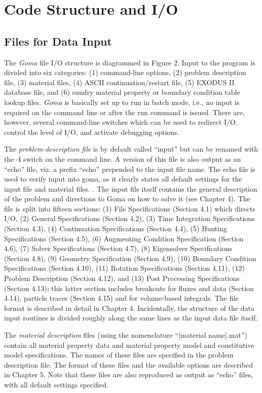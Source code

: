 \chapter{Code Structure and I/O}
%
%
\section{Files for Data Input}
%
%
The \emph{Goma} file I/O structure is diagrammed in Figure 2. Input to the program is divided into six categories: (1) command-line options, (2) problem description file, (3) material files, (4) ASCII continuation/restart file, (5) EXODUS II database file, and (6) sundry material property or boundary condition table lookup files. \emph{Goma} is basically set up to run in batch mode, i.e., no input is required on the command line or after the run command is issued. There are, however, several command-line switches which can be used to redirect I/O, control the level of I/O, and activate debugging options.

The \emph{problem-description file} is by default called “input” but can be renamed with the -\textbf{i} switch on the command line. A version of this file is also output as an “echo” file, viz. a prefix “echo” prepended to the input file name. The echo file is used to verify input into goma, as it clearly
states all default settings for the input file and material files. . The input file itself contains the general description of the problem and directions to Goma on how to solve it (see Chapter 4). The file is split into fifteen sections: (1) File Specifications (Section 4.1) which directs I/O, (2) General Specifications (Section 4.2), (3) Time Integration Specifications (Section 4.3), (4) Continuation Specifications (Section 4.4), (5) Hunting Specifications (Section 4.5), (6) Augmenting Condition Specification (Section 4.6), (7) Solver Specifications (Section 4.7), (8) Eigensolver Specifications (Section 4.8), (9) Geometry Specification (Section 4.9), (10) Boundary Condition Specifications (Section 4.10), (11) Rotation Specifications (Section 4.11), (12) Problem Description (Section 4.12), and (13) Post Processing Specifications (Section 4.13); this latter section includes breakouts for fluxes and data (Section 4.14), particle traces (Section 4.15) and for volume-based integrals. The file format is described in detail in Chapter 4. Incidentally, the structure of the data input routines is divided roughly along the same lines as the input data file itself.

The \emph{material description} files (using the nomenclature “[material name].mat”) contain all material property data and material property model and constitutive model specifications. The names of these files are specified in the problem description file. The format of these files and the available options are described in Chapter 5. Note that these files are also reproduced as output as “echo” files, with all default settings specified.

